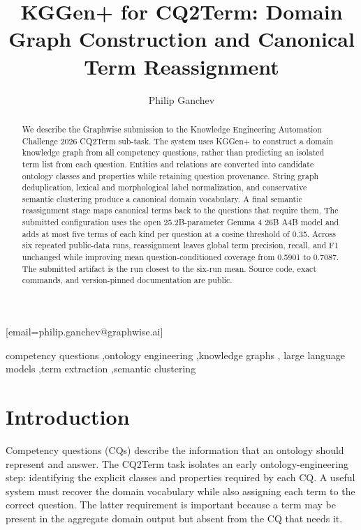 \documentclass{ceurart}
\begin{document}

\title{KGGen+ for CQ2Term: Domain Graph Construction and Canonical Term Reassignment}

\author[1]{Philip Ganchev}[email=philip.ganchev@graphwise.ai]
\address[1]{Graphwise}

\begin{abstract}
We describe the Graphwise submission to the Knowledge Engineering Automation
Challenge 2026 CQ2Term sub-task. The system uses KGGen+ to construct a domain
knowledge graph from all competency questions, rather than predicting an
isolated term list from each question. Entities and relations are converted
into candidate ontology classes and properties while retaining question
provenance. String graph deduplication, lexical and morphological label
normalization, and conservative semantic clustering produce a canonical
domain vocabulary. A final semantic reassignment stage maps canonical terms
back to the questions that require them. The submitted configuration uses the
open 25.2B-parameter Gemma 4 26B A4B model and adds at most five terms of each
kind per question at a cosine threshold of 0.35. Across six repeated
public-data runs, reassignment leaves global term precision, recall, and F1
unchanged while improving mean question-conditioned coverage from 0.5901 to
0.7087. The submitted artifact is the run closest to the six-run mean. Source
code, exact commands, and version-pinned documentation are public.
\end{abstract}

\begin{keywords}
competency questions \sep ontology engineering \sep knowledge graphs \sep
large language models \sep term extraction \sep semantic clustering
\end{keywords}

\maketitle

\section{Introduction}

Competency questions (CQs) describe the information that an ontology should
represent and answer. The CQ2Term task isolates an early ontology-engineering
step: identifying the explicit classes and properties required by each CQ. A
useful system must recover the domain vocabulary while also assigning each
term to the correct question. The latter requirement is important because a
term may be present in the aggregate domain output but absent from the CQ that
needs it.
\end{document}
